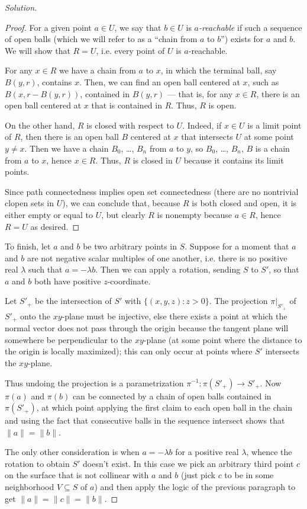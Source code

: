 \documentclass[10pt]{scrartcl}
\providecommand{\inv}{^{-1}}
\newenvironment{soln}{\begin{proof}[Solution]}{\end{proof}}
\begin{document}
\begin{soln}
	\begin{proof}
		For a given point $a\in U$, we say that $b\in U$ is
		\emph{$a$-reachable} if such a sequence of open balls
		(which we will refer to as a ``chain from $a$ to $b$'')
		exists for $a$ and $b$. We will show that $R = U$, i.e.
		every point of $U$ is $a$-reachable.
		
		For any $x\in R$ we have a chain from $a$ to $x$,
		in which the terminal ball, say $B(y, r)$, contains $x$.
		Then, we can find an open ball centered at $x$, such as
		$B(x, r - B(y, r))$, contained in $B(y, r)$ ---
		that is, for any $x\in R$, there is an open ball centered at $x$
		that is contained in $R$. Thus, $R$ is open.
		
		On the other hand, $R$ is closed with respect to $U$.
		Indeed, if $x\in U$ is a limit point of $R$,
		then there is an open ball $B$ centered at $x$ that intersects $U$
		at some point $y\ne x$. Then we have a chain
		$B_0$, \dots, $B_n$ from $a$ to $y$, so $B_0$, \dots, $B_n$, $B$
		is a chain from $a$ to $x$, hence $x\in R$.
		Thus, $R$ is closed in $U$ because it contains its limit points.
		
		Since path connectedness implies open set connectedness
		(there are no nontrivial clopen sets in $U$),
		we can conclude that, because $R$ is both closed and open,
		it is either empty or equal to $U$, but clearly $R$
		is nonempty because $a\in R$, hence $R = U$ as desired.
	\end{proof}
	
	To finish, let $a$ and $b$ be two arbitrary points in $S$.
	Suppose for a moment that $a$ and $b$ are not negative scalar multiples
	of one another, i.e. there is no positive real $\lambda$
	such that $a = -\lambda b$. Then we can apply a rotation,
	sending $S$ to $S'$, so that $a$ and $b$ both have positive $z$-coordinate.
	
	Let $S'_+$ be the intersection of $S'$ with $\{(x,y,z) : z>0\}$.
	The projection $\pi|_{S'_+}$ of $S'_+$ onto the $xy$-plane
	must be injective, else there exists a point at which
	the normal vector does not pass through the origin because
	the tangent plane will somewhere be perpendicular to the $xy$-plane
	(at some point where the distance to the origin is locally maximized);
	this can only occur at points where $S'$ intersects the $xy$-plane.
	
	Thus undoing the projection is a parametrization
	$\pi\inv\colon \pi(S'_+)\to S'_+$. Now $\pi(a)$ and $\pi(b)$
	can be connected by a chain of open balls contained in $\pi(S'_+)$,
	at which point applying the first claim to each open ball in the chain
	and using the fact that consecutive balls in the sequence intersect
	shows that $\|a\| = \|b\|$.
	
	The only other consideration is when $a = -\lambda b$ for a
	positive real $\lambda$, whence the rotation to obtain $S'$ doesn't exist.
	In this case we pick an arbitrary third point $c$ on the surface
	that is not collinear with $a$ and $b$ (just pick $c$
	to be in some neighborhood $V\subseteq S$ of $a$)
	and then apply the logic of the previous paragraph to get
	$\|a\| = \|c\| = \|b\|$.
\end{soln}
\end{document}
